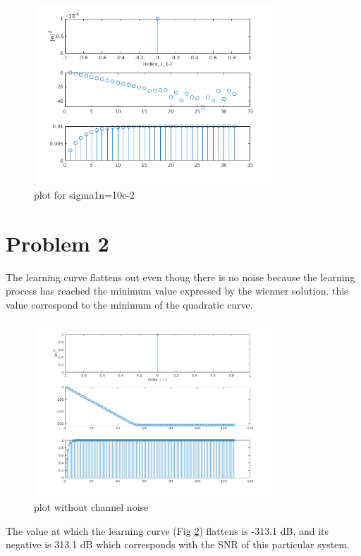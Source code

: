 \documentclass[12pt,letterpaper]{article}
\begin{document}
\begin{figure}[!h] 
    \centering
    \includegraphics[width=0.8\textwidth]{../matlab/img/e-2.png}
    \caption{plot for sigma1n=10e-2}
    \label{fig:simu2}
\end{figure}
    

\section{Problem 2}
The learning curve flattens out even thoug there is no noise because the learning process has reached the minimum
value expressed by the wienner solution. this value correspond to the minimum of the quadratic curve.

\begin{figure}[!h] 
  \centering
  \includegraphics[width=0.8\textwidth]{../matlab/img/flat.png}
  \caption{plot without channel noise}
  \label{fig:flat}
\end{figure}

The value at which the learning curve (Fig \ref{fig:flat}) flattens is -313.1 dB, and its negative is 313.1 dB which corresponds with 
the SNR of this particular system.
\end{document}
